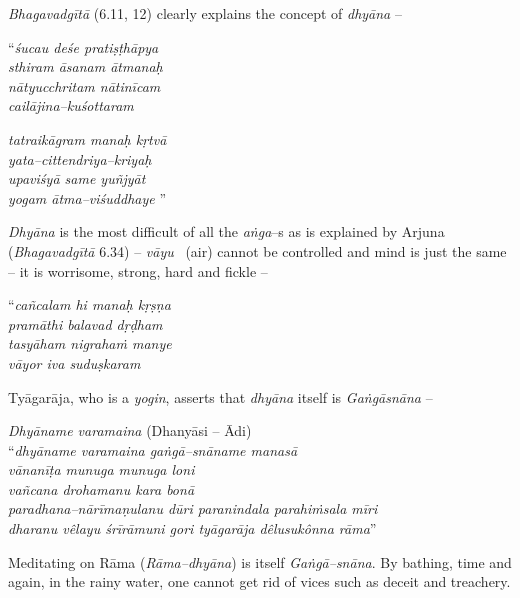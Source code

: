 \textit{Bhagavadgītā} (6.11, 12) clearly explains the concept of \textit{dhyāna} –

\begin{myquote}
“\textit{śucau deśe pratiṣṭhāpya}\\\textit{sthiram āsanam ātmanaḥ }\\\textit{nātyucchritam nātinīcam}\\\textit{cailājina–kuśottaram }
\end{myquote}

\begin{myquote}
\textit{tatraikāgram manaḥ kṛtvā}\\\textit{yata–cittendriya–kriyaḥ }\\\textit{upaviśyā same yuñjyāt}\\\textit{yogam ātma–viśuddhaye} ”
\end{myquote}

\newpage

\textit{Dhyāna} is the most difficult of all the \textit{aṅga}–s as is explained by Arjuna (\textit{Bhagavadgītā} 6.34) – \textit{vāyu}  (air) cannot be controlled and mind is just the same – it is worrisome, strong, hard and fickle –

\begin{myquote}
“\textit{cañcalam hi manaḥ kṛṣṇa}\\\textit{pramāthi balavad dṛḍham }\\\textit{tasyāham nigrahaṁ manye}\\\textit{vāyor iva suduṣkaram} 
\end{myquote}

Tyāgarāja, who is a \textit{yogin}, asserts that \textit{dhyāna} itself is \textit{Gaṅgāsnāna} –

\begin{myquote}
\textit{Dhyāname varamaina} (Dhanyāsi – Ādi)\\ “\textit{dhyāname varamaina gaṅgā–snāname manasā}\\\textit{vānanīṭa munuga munuga loni} \\\textit{vañcana drohamanu kara bonā}\\\textit{paradhana–nārīmaṇulanu dūri paranindala parahiṁsala mīri}\\\textit{dharanu vêlayu śrīrāmuni gori tyāgarāja dêlusukônna rāma}”
\end{myquote}

Meditating on Rāma (\textit{Rāma–dhyāna}) is itself \textit{Gaṅgā–snāna}. By bathing, time and again, in the rainy water, one cannot get rid of vices such as deceit and treachery. 

